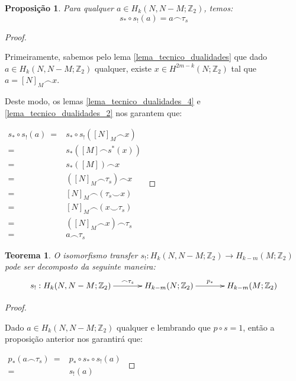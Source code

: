 \documentclass[12pt,oneside]{book} %
\newtheorem{teo}    {\hspace{0.5cm}Teorema}[chapter]
\newtheorem{prop}   {\hspace{0.5cm}Proposi\c c\~ao}[chapter]
\newcommand{\Z}{\mathbb{Z}}
\newcommand{\ccup}{\smile}
\newcommand{\ccap}{\frown}
\begin{document}
\begin{prop}
	Para qualquer $a\in H_{k}(N,N-M;\Z_{2})$, temos:
	$$ s_{*}\circ s_{!}(a)=a\ccap\tau_{s} $$
\end{prop}
\begin{proof}
	
	\
	
	\par Primeiramente, sabemos pelo lema \ref{lema_tecnico_dualidades} que dado $a\in H_{k}(N,N-M;\Z_{2})$ qualquer, existe $x\in H^{2m-k}(N;\Z_{2})$ tal que $a=[N]_{M}\ccap x$.
	
	\par Deste modo, os lemas \ref{lema_tecnico_dualidades_4} e \ref{lema_tecnico_dualidades_2} nos garantem que: \newline
	
	$ \begin{array}{rl}
		s_{*}\circ s_{!}(a) \ = & s_{*}\circ s_{!}([N]_{M}\ccap x) \\
		= & s_{*}([M]\ccap s^{*}(x)) \\
		= & s_{*}([M])\ccap x \\
		= & \left( [N]_{M}\ccap \tau_{s} \right)\ccap x \\
		= & [N]_{M}\ccap \left( \tau_{s}\ccup x \right) \\
		= & [N]_{M}\ccap \left( x\ccup \tau_{s} \right) \\
		= & \left( [N]_{M}\ccap x \right)\ccap \tau_{s} \\
		= & a\ccap\tau_{s}
	\end{array} $
	
\end{proof}

\begin{teo}
	O isomorfismo transfer $s_{!}:H_{k}(N,N-M;\Z_{2})\to H_{k-m}(M;\Z_{2})$ pode ser decomposto da seguinte maneira:
	$$ \xymatrix @C=0.5cm {
		s_{!}:H_{k}(N,N-M;\Z_{2}) \ar[rr]^-{\ccap \tau_{s}} && H_{k-m}(N;\Z_{2}) \ar[rr]^-{p_{*}} && H_{k-m}(M;\Z_{2})
	} $$
\end{teo}
\begin{proof}
	
	\
	
	\par Dado $a\in H_{k}(N,N-M;\Z_{2})$ qualquer e lembrando que $p\circ s=1$, então a proposição anterior nos garantirá que:\newline
	
	$ \begin{array}{rl}
		p_{*}(a\ccap\tau_{s}) \ = & p_{*}\circ s_{*}\circ s_{!}(a) \\
		= & s_{!}(a)
	\end{array} $
	
\end{proof}
\end{document}
